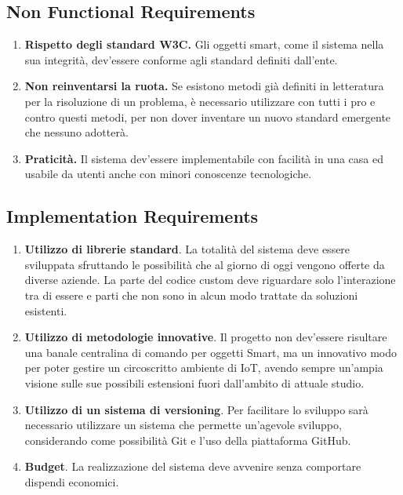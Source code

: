 \documentclass[12pt,a4paper,openright,oneside]{report}
\begin{document}
\subsection{Non Functional Requirements}
\begin{enumerate}[label*=\arabic*.]
	\item \textbf{Rispetto degli standard W3C.} Gli oggetti smart, come il sistema nella sua integrità, dev'essere conforme agli standard definiti dall'ente.
	
	\item \textbf{Non reinventarsi la ruota.} Se esistono metodi già definiti in letteratura per la risoluzione di un problema, è necessario utilizzare con tutti i pro e contro questi metodi, per non dover inventare un nuovo standard emergente che nessuno adotterà.
	
	\item \textbf{Praticità.} Il sistema dev'essere implementabile con facilità in una casa ed usabile da utenti anche con minori conoscenze tecnologiche.
\end{enumerate}

\subsection{Implementation Requirements}
\begin{enumerate}[label*=\arabic*.]
	\item \textbf{Utilizzo di librerie standard}. La totalità del sistema deve essere sviluppata sfruttando le possibilità che al giorno di oggi vengono offerte da diverse aziende. La parte del codice custom deve riguardare solo l'interazione tra di essere e parti che non sono in alcun modo trattate da soluzioni esistenti.
	
	\item \textbf{Utilizzo di metodologie innovative}. Il progetto non dev'essere risultare una banale centralina di comando per oggetti Smart, ma un innovativo modo per poter gestire un circoscritto ambiente di IoT, avendo sempre un'ampia visione sulle sue possibili estensioni fuori dall'ambito di attuale studio.
	
	\item \textbf{Utilizzo di un sistema di versioning}. Per facilitare lo sviluppo sarà necessario utilizzare un sistema che permette un'agevole sviluppo, considerando come possibilità Git e l'uso della piattaforma GitHub.
	
	\item \textbf{Budget}. La realizzazione del sistema deve avvenire senza comportare dispendi economici.
\end{enumerate}
\end{document}
